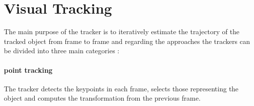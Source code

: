 %

\section{Visual Tracking}

The main purpose of the tracker is to iteratively estimate the trajectory of the tracked object from frame to frame and regarding the approaches the trackers can be divided into three main categories \cite{Yilmaz:2006:OTS:1177352.1177355}:

\paragraph{point tracking} 
The tracker detects the keypoints in each frame, selects those representing the object and computes the transformation from the previous frame.

